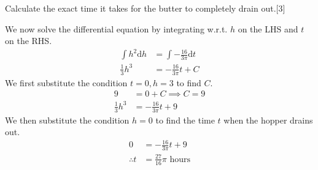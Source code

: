 \documentclass[12pt, a4 paper]{article}
\begin{document}
\begin{outline}[enumerate]
 \2 Calculate the exact time it takes for the butter to completely drain out.\hfill[3]
 \begin{answer}
  We now solve the differential equation by integrating w.r.t. $h$ on the LHS and $t$ on the RHS.
  \begin{align*}
   \int {h^2}\mathrm{d}h & = \int - \frac{16}{3\pi} \mathrm{d}t \\
   \frac{1}{3}h^3        & = -\frac{16}{3\pi}t + C
  \end{align*}
  We first substitute the condition $t=0,h=3$ to find $C$.
  \begin{align*}
   9              & = 0 + C \implies C=9    \\
   \frac{1}{3}h^3 & = -\frac{16}{3\pi}t + 9
  \end{align*}
  We then substitute the condition $h=0$ to find the time $t$ when the hopper drains out.
  \begin{align*}
   0            & = -\frac{16}{3\pi}t + 9           \\
   \therefore t & =\frac{27}{16}\pi \textrm{ hours}
  \end{align*}
 \end{answer}


\end{outline}
\end{document}
